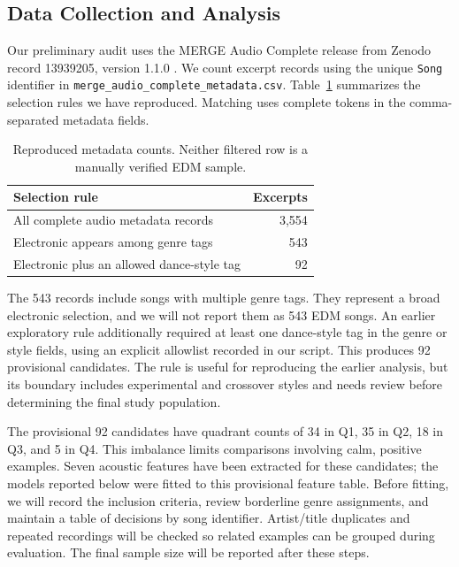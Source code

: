 \subsection{Data Collection and Analysis}
\label{sec:selection}

Our preliminary audit uses the MERGE Audio Complete release from Zenodo record 13939205, version 1.1.0 \cite{mergedata}. We count excerpt records using the unique \texttt{Song} identifier in \texttt{merge\_audio\_complete\_metadata.csv}. Table~\ref{tab:sampleaudit} summarizes the selection rules we have reproduced. Matching uses complete tokens in the comma-separated metadata fields.

\begin{table}[ht]
\centering
\caption{Reproduced metadata counts. Neither filtered row is a manually verified EDM sample.}
\label{tab:sampleaudit}
\begin{tabular}{lr}
\toprule
Selection rule & Excerpts \\
\midrule
All complete audio metadata records & 3,554 \\
Electronic appears among genre tags & 543 \\
Electronic plus an allowed dance-style tag & 92 \\
\bottomrule
\end{tabular}
\end{table}

The 543 records include songs with multiple genre tags. They represent a broad electronic selection, and we will not report them as 543 EDM songs. An earlier exploratory rule additionally required at least one dance-style tag in the genre or style fields, using an explicit allowlist recorded in our script. This produces 92 provisional candidates. The rule is useful for reproducing the earlier analysis, but its boundary includes experimental and crossover styles and needs review before determining the final study population. 

The provisional 92 candidates have quadrant counts of 34 in Q1, 35 in Q2, 18 in Q3, and 5 in Q4. This imbalance limits comparisons involving calm, positive examples. Seven acoustic features have been extracted for these candidates; the models reported below were fitted to this provisional feature table. Before fitting, we will record the inclusion criteria, review borderline genre assignments, and maintain a table of decisions by song identifier. Artist/title duplicates and repeated recordings will be checked so related examples can be grouped during evaluation. The final sample size will be reported after these steps.

